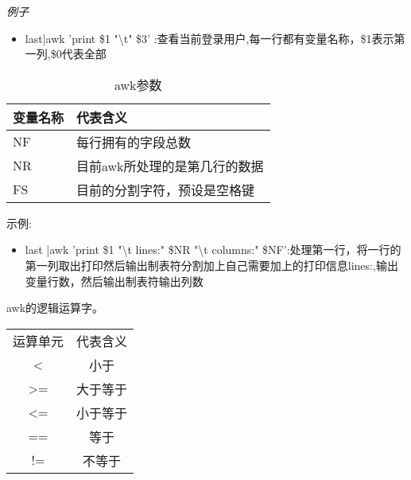 \textit{例子}
\begin{itemize}
	\item  last|awk '{print \$1 "\textbackslash t" \$3}' :查看当前登录用户,每一行都有变量名称，\$1表示第一列,\$0代表全部
	
\end{itemize}
\begin{table}[h!]
\centering
{
\begin{tabular}{ |p{3cm}|p{3cm}|  }
	\hline 
	变量名称 & 代表含义 \\
	\hline
	NF & 每行拥有的字段总数 \\
	NR    &目前awk所处理的是第几行的数据\\
	FS & 目前的分割字符，预设是空格键 \\
	\hline
\end{tabular}}
	\caption{awk参数}
\end{table}
示例:
\begin{itemize}
		\item last |awk '{print \$1 "\textbackslash t lines:" \$NR "\textbackslash t columns:" \$NF}':处理第一行，将一行的第一列取出打印然后输出制表符分割加上自己需要加上的打印信息lines:,输出变量行数，然后输出制表符输出列数
\end{itemize}
awk的逻辑运算字。
\begin{table}[h]
\centering
{
	\begin{tabular}{|c|c|}
		\hline
		运算单元&代表含义\\
		<&小于\\
		>=&大于等于\\
		<=&小于等于\\
		==&等于\\
		!=&不等于\\
		\hline
	\end{tabular}}
\end{table}

